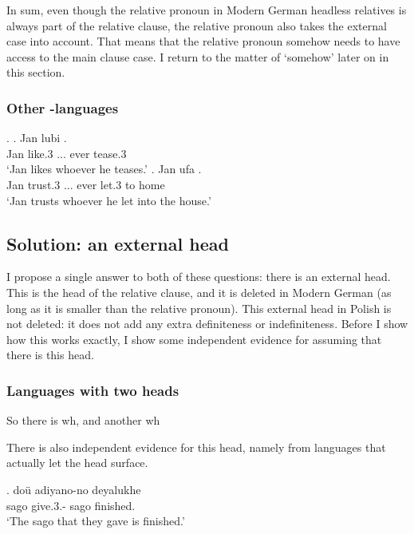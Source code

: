 In sum, even though the relative pronoun in Modern German headless relatives is always part of the relative clause, the relative pronoun also takes the external case into account. That means that the relative pronoun somehow needs to have access to the main clause case. I return to the matter of `somehow' later on in this section.





\subsubsection{Other -languages}

\ex.
\ag. Jan lubi   .\\
Jan like.3\scsub{[acc]} ... ever tease.3\scsub{[dat]}\\
`Jan likes whoever he teases.'
\bg. Jan ufa     .\\
 Jan trust.3\scsub{[dat]} ... ever let.3\scsub{[acc]} to home\\
 `Jan trusts whoever he let into the house.'





\subsection{Solution: an external head}

I propose a single answer to both of these questions: there is an external head. This is the head of the relative clause, and it is deleted in Modern German (as long as it is smaller than the relative pronoun). This external head in Polish is not deleted: it does not add any extra definiteness or indefiniteness. Before I show how this works exactly, I show some independent evidence for assuming that there is this head.


\subsubsection{Languages with two heads}

So there is wh, and another wh

There is also independent evidence for this head, namely from languages that actually let the head surface.

\exg. doü adiyano-no  deyalukhe\\
 sago give.3.- sago finished.\\
 `The sago that they gave is finished.' 

